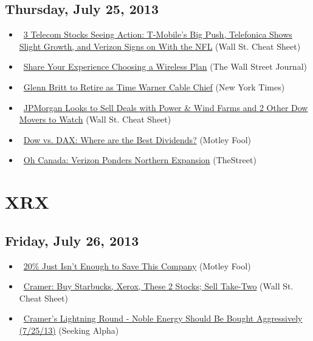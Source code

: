 \documentclass[11pt,asymmetric]{article}
\begin{document}
\subsection*{Thursday, July 25, 2013}
\begin{itemize}
\item\ \href{http://wallstcheatsheet.com/stocks/3-telecom-stocks-seeing-action-t-mobiles-big-push-telefonica-shows-slight-growth-and-verizon-signs-on-with-the-nfl.html/?ref=YF}{3 Telecom Stocks Seeing Action: T-Mobile’s Big Push, Telefonica Shows Slight Growth, and Verizon Signs on With the NFL} (Wall St. Cheat Sheet)
\item\ \href{http://blogs.wsj.com/digits/2013/07/25/tell-us-are-you-happy-with-your-wireless-plan/?mod=yahoo_hs}{Share Your Experience Choosing a Wireless Plan} (The Wall Street Journal)
\item\ \href{http://www.nytimes.com/2013/07/26/business/media/glenn-britt-to-retire-as-time-warner-cable-chief.html?partner=yahoofinance}{Glenn Britt to Retire as Time Warner Cable Chief} (New York Times)
\item\ \href{http://wallstcheatsheet.com/stocks/jpmorgan-looks-to-sell-deals-with-power-wind-farms-and-2-other-dow-movers-to-watch.html/?ref=YF}{JPMorgan Looks to Sell Deals with Power \& Wind Farms and 2 Other Dow Movers to Watch} (Wall St. Cheat Sheet)
\item\ \href{http://beta.fool.com/truth2power/2013/07/25/dow-vs-dax-where-are-the-dividends/41490/?source=eogyholnk0000001}{Dow vs. DAX: Where are the Best Dividends?} (Motley Fool)
\item\ \href{http://www.thestreet.com/story/11989693/1/oh-canada-verizon-ponders-northern-expansion.html?puc=yahoo&cm_ven=YAHOO}{Oh Canada: Verizon Ponders Northern Expansion} (TheStreet)
\end{itemize}

\section*{XRX}

\subsection*{Friday, July 26, 2013}
\begin{itemize}
\item\ \href{http://beta.fool.com/mhenage/2013/07/25/20-just-isnt-enough-to-save-this-company/41428/?source=eogyholnk0000001}{20\% Just Isn’t Enough to Save This Company} (Motley Fool)
\item\ \href{http://wallstcheatsheet.com/investing/cramer-buy-starbucks-xerox-these-2-stocks-sell-take-two.html/?ref=YF}{Cramer: Buy Starbucks, Xerox, These 2 Stocks; Sell Take-Two} (Wall St. Cheat Sheet)
\item\ \href{http://seekingalpha.com/article/1575192-cramers-lightning-round-noble-energy-should-be-bought-aggressively-7-25-13?source=yahoo}{Cramer's Lightning Round - Noble Energy Should Be Bought Aggressively (7/25/13)} (Seeking Alpha)
\end{itemize}
\end{document}
